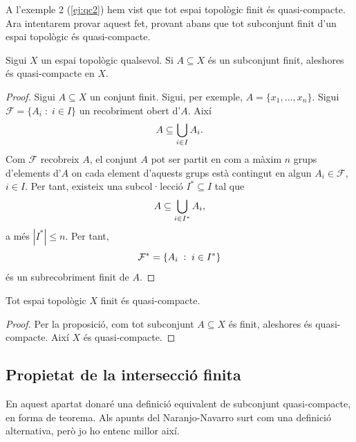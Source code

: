 \documentclass[../main.tex]{subfiles}
\begin{document}
A l'exemple 2 (\ref{ej:qc2}) hem vist que tot espai topològic finit és quasi-compacte. Ara intentarem provar aquest fet, provant abans que tot subconjunt finit d'un espai topològic és quasi-compacte.

\begin{prop}
\label{prop:subconjuntfinitqc} Sigui $X$ un espai topològic qualsevol. Si $A\subseteq X$ és un subconjunt finit, aleshores és quasi-compacte en $X$.
\end{prop}
\begin{proof}
Sigui $A\subseteq X$ un conjunt finit. Sigui, per exemple, $A = \{x_1,\ldots,x_n\}$. Sigui $\mathcal{F}=\{A_i\;:\;i\in I\}$ un recobriment obert d'$A$. Així
\begin{equation}
    \notag
    A\subseteq \bigcup_{i\in I}A_i.
\end{equation}
Com $\mathcal{F}$ recobreix $A$, el conjunt $A$ pot ser partit en com a màxim $n$ grups d'elements d'$A$ on cada element d'aquests grups està contingut en algun $A_i\in\mathcal{F}$, $i\in I$. Per tant, existeix una subcol·lecció $I^*\subseteq I$ tal que 
\begin{equation}
    \notag
    A\subseteq \bigcup_{i\in I^*}A_i,
\end{equation}
a més $|I^*|\leq n$. Per tant,
\begin{equation}
    \notag
    \mathcal{F}^*=\{A_i\;:\;i\in I^*\}
\end{equation} és un subrecobriment finit de $A$.
\end{proof}

\begin{coro}
\label{coro:totespaifinitesqc} Tot espai topològic $X$ finit és quasi-compacte.
\end{coro}
\begin{proof}
Per la proposició, com tot subconjunt $A\subseteq X$ és finit, aleshores és quasi-compacte. Així $X$ és quasi-compacte.
\end{proof}

\subsection{Propietat de la intersecció finita}

En aquest apartat donaré una definició equivalent de subconjunt quasi-compacte, en forma de teorema. Als apunts del Naranjo-Navarro surt com una definició alternativa, però jo ho entenc millor així.
\end{document}

